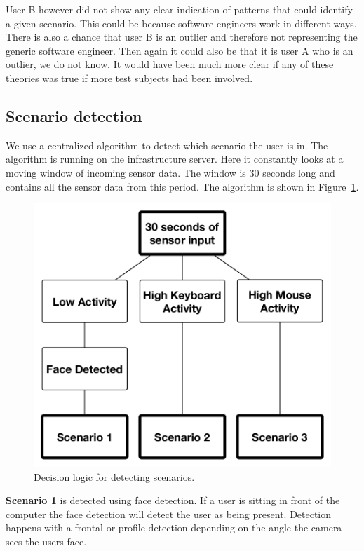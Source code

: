\documentclass{sigchi}
\begin{document}
User B however did not show any clear indication of patterns that could identify a given scenario.
This could be because software engineers work in different ways.
There is also a chance that user B is an outlier and therefore not representing the generic software engineer.
Then again it could also be that it is user A who is an outlier, we do not know.
It would have been much more clear if any of these theories was true if more test subjects had been involved.

\subsection{Scenario detection}
We use a centralized algorithm to detect which scenario the user is in.
The algorithm is running on the infrastructure server.
Here it constantly looks at a moving window of incoming sensor data.
The window is 30 seconds long and contains all the sensor data from this period.
The algorithm is shown in Figure~\ref{fig:decision_logic}.

\begin{figure}[H]
  \centering
  \includegraphics[width=\columnwidth]{figures/decision_logic.pdf}
  \caption{Decision logic for detecting scenarios.}
  \label{fig:decision_logic}
\end{figure}

\textbf{Scenario 1} is detected using face detection.
If a user is sitting in front of the computer the face detection will detect the user as being present.
Detection happens with a frontal or profile detection depending on the angle the camera sees the users face.
\end{document}
